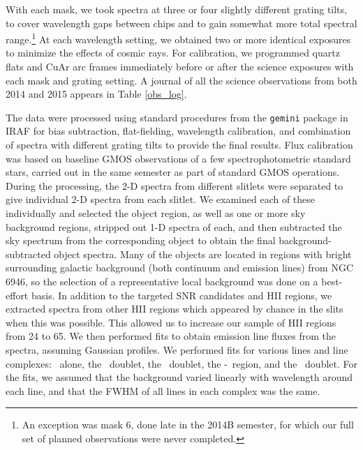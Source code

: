 With each mask, we took spectra at three or four slightly different grating tilts, to cover wavelength gaps between chips and to gain somewhat more total spectral range.\footnote{An exception was mask 6, done late in the 2014B semester, for which our full set of planned observations were never completed.}  At each wavelength setting, we obtained two or more identical exposures to minimize the effects of cosmic rays.
For calibration, we programmed quartz flats and CuAr arc frames immediately before or after the science exposures with each mask and grating setting.  A journal of all the science observations from both 2014 and 2015 appears in Table \ref{obs_log}.  


The data were processed using standard procedures  from the {\tt gemini} package in IRAF  for bias subtraction, flat-fielding, wavelength calibration, and combination of spectra with different grating tilts to provide the final results.  
Flux calibration was based on baseline GMOS observations of a few spectrophotometric standard stars, carried out in the same semester as part of standard GMOS operations.  
During the processing, the 2-D spectra from different slitlets were separated to give individual 2-D spectra from each slitlet.   We examined each of these individually and selected the object region, as well as one or more sky background regions,  stripped out 1-D spectra of each, and then subtracted the sky spectrum from the corresponding object to obtain the final background-subtracted object spectra.  
Many of the objects are located in regions with bright surrounding galactic background (both continuum and emission lines) from NGC\,6946, so the selection of a representative local background was done on a best-effort basis.    In addition to the targeted SNR candidates and HII regions, we extracted spectra from other HII regions which appeared by chance in the slits when this was possible.   This allowed us to increase our sample of HII regions from 24 to 65.
We then performed  fits to obtain emission line fluxes  from the spectra, assuming Gaussian profiles.  We performed fits for various lines and line complexes:  \hb\ alone,  the \oiii\ doublet,  the \oi\ doublet,  the \ha-\nii\ region, and   the \sii\ doublet. For the fits, we assumed that the background varied linearly with wavelength around each line, and that the FWHM of all lines in each complex was the same.

